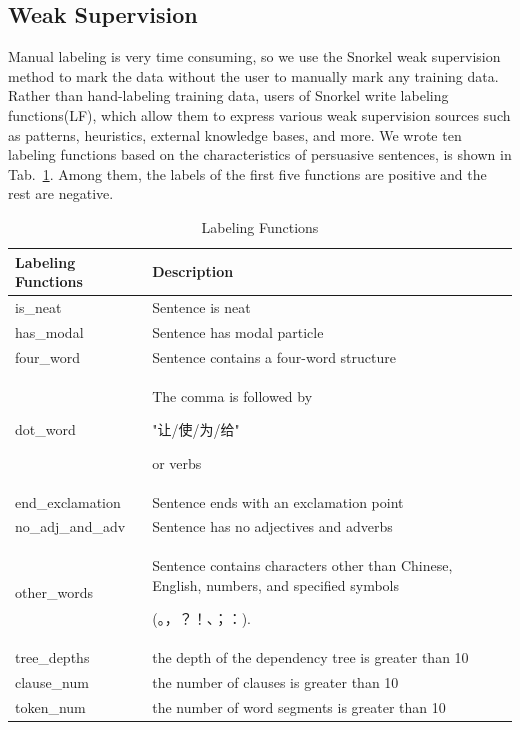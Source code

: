 \documentclass[sigconf]{acmart}
\begin{document}
\subsection{Weak Supervision}
Manual labeling is very time consuming, so we use the Snorkel \cite{ratner2017snorkel} weak supervision method to mark the data without the user to manually mark any training data. Rather than hand-labeling training data, users of Snorkel write labeling functions(LF), which allow them to express various weak supervision sources such as patterns, heuristics, external knowledge bases, and more. We wrote ten labeling functions based on the characteristics of persuasive sentences, is shown in Tab.~\ref{table:LF}. Among them, the labels of the first five functions are positive and the rest are negative.

\begin{table}
  \caption{Labeling Functions}
  \label{table:LF}
  \begin{tabular}{p{2.5cm}p{5cm}}
    \toprule
    Labeling Functions & Description\\
    \midrule
    is\_neat & Sentence is neat\\
    has\_modal & Sentence has modal particle\\
    four\_word & Sentence contains a four-word structure \\
    dot\_word & The comma is followed by
        \begin{CJK*}{UTF8}{gbsn}
            "让/使/为/给"
        \end{CJK*}
        or verbs\\
    end\_exclamation & Sentence ends with an exclamation point\\
    no\_adj\_and\_adv & Sentence has no adjectives and adverbs\\
    other\_words & Sentence contains characters other than Chinese, English, numbers, and specified symbols
        \begin{CJK*}{UTF8}{gbsn}
            (。，？！、；：).
        \end{CJK*}\\
    tree\_depths & the depth of the dependency tree is greater than 10\\
    clause\_num & the number of clauses is greater than 10\\
    token\_num & the number of word segments is greater than 10\\
  \bottomrule
\end{tabular}
\end{table}
\end{document}
